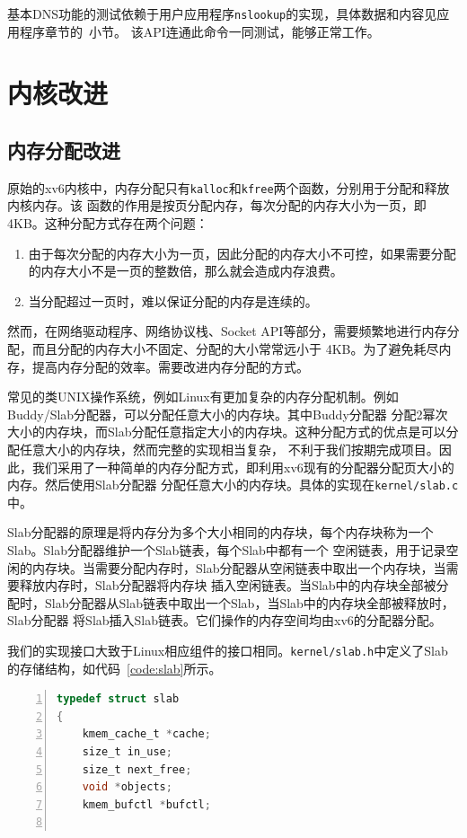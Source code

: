 \documentclass[a4paper,twoside]{ctexrep}
\begin{document}
\begin{spacing}{1.2}
基本DNS功能的测试依赖于用户应用程序\texttt{nslookup}的实现，具体数据和内容见应用程序章节的~小节。
该API连通此命令一同测试，能够正常工作。

\section{内核改进}

\subsection{内存分配改进}

原始的xv6内核中，内存分配只有\texttt{kalloc}和\texttt{kfree}两个函数，分别用于分配和释放内核内存。该
函数的作用是按页分配内存，每次分配的内存大小为一页，即4KB。这种分配方式存在两个问题：
\begin{enumerate}
	\item 由于每次分配的内存大小为一页，因此分配的内存大小不可控，如果需要分配的内存大小不是一页的整数倍，那么就会造成内存浪费。
	\item 当分配超过一页时，难以保证分配的内存是连续的。
\end{enumerate}
然而，在网络驱动程序、网络协议栈、Socket API等部分，需要频繁地进行内存分配，而且分配的内存大小不固定、分配的大小常常远小于
4KB。为了避免耗尽内存，提高内存分配的效率。需要改进内存分配的方式。

常见的类UNIX操作系统，例如Linux有更加复杂的内存分配机制。例如Buddy/Slab分配器，可以分配任意大小的内存块。其中Buddy分配器
分配2幂次大小的内存块，而Slab分配任意指定大小的内存块。这种分配方式的优点是可以分配任意大小的内存块，然而完整的实现相当复杂，
不利于我们按期完成项目。因此，我们采用了一种简单的内存分配方式，即利用xv6现有的分配器分配页大小的内存。然后使用Slab分配器
分配任意大小的内存块。具体的实现在\texttt{kernel/slab.c}中。

Slab分配器的原理是将内存分为多个大小相同的内存块，每个内存块称为一个Slab。Slab分配器维护一个Slab链表，每个Slab中都有一个
空闲链表，用于记录空闲的内存块。当需要分配内存时，Slab分配器从空闲链表中取出一个内存块，当需要释放内存时，Slab分配器将内存块
插入空闲链表。当Slab中的内存块全部被分配时，Slab分配器从Slab链表中取出一个Slab，当Slab中的内存块全部被释放时，Slab分配器
将Slab插入Slab链表。它们操作的内存空间均由xv6的分配器分配。

我们的实现接口大致于Linux相应组件的接口相同。\texttt{kernel/slab.h}中定义了Slab的存储结构，如代码~\ref{code:slab}所示。
\begin{lstlisting}[numbers=left,style=CppStyle,caption={Slab的存储结构},label={code:slab},language=C]
typedef struct slab
{
	kmem_cache_t *cache;
	size_t in_use;
	size_t next_free;
	void *objects;
	kmem_bufctl *bufctl;


\end{lstlisting}
\end{spacing}
\end{document}
